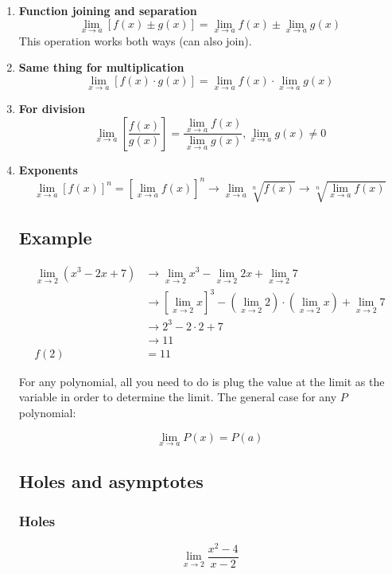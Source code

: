 \documentclass{article}
\begin{document}
\begin{enumerate}
    \item \textbf{Function joining and separation}
        $$
        \lim_{x\to a} [f(x) \pm g(x)] = \lim_{x\to a}f(x) \pm \lim_{x\to a}g(x)
        $$
        This operation works both ways (can also join).

    \item \textbf{Same thing for multiplication}
        $$
        \lim_{x\to a} [f(x) \cdot g(x)] = \lim_{x\to a}f(x) \cdot \lim_{x\to a}g(x)
        $$
    \item \textbf{For division}
        $$
        \lim_{x\to a} \left[ \frac{f(x)}{g(x)} \right] = \frac{\lim_{x\to
        a}f(x)}{\lim_{x\to a}g(x)}, \lim_{x\to a}g(x) \neq 0
        $$

    \item \textbf{Exponents}
        $$
        \lim_{x\to a}[f(x)]^n = \left[\lim_{x\to a} f(x) \right]^n \rightarrow \lim_{x\to
        a} \sqrt[n]{f(x)} \rightarrow \sqrt[n]{\lim_{x\to a}f(x)}
        $$
\subsection{Example}

\begin{align*}
    \lim_{x \to 2} (x^3 - 2x + 7) &\rightarrow \lim_{x \to 2} x^3 - \lim_{x \to 2} 2x +
\lim_{x\to 2} 7\\
                                  &\rightarrow \left[ \lim_{x \to 2} x \right]^3 - \left(
                                  \lim_{x\to 2} 2\right) \cdot \left( \lim_{x\to 2} x
                              \right) + \lim_{x\to 2} 7\\
                                  & \rightarrow 2^3 - 2 \cdot 2 + 7\\
                                  & \rightarrow 11\\
    f(2) &= 11
\end{align*}

For any polynomial, all you need to do is plug the value at the limit as the variable in
order to determine the limit. The general case for any $P$ polynomial:

$$
\lim_{x \to a}P(x) = P(a)
$$

\subsection{Holes and asymptotes}

\subsubsection{Holes}
$$
\lim_{x\to 2} \frac{x^2 - 4}{x-2}
$$


\end{enumerate}
\end{document}
